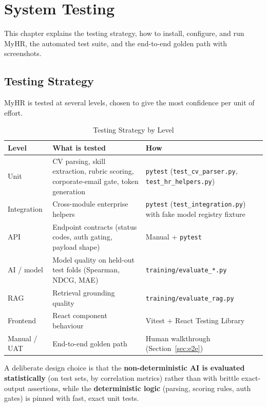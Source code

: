 \documentclass[12pt,a4paper,oneside]{report}
\begin{document}
\chapter{System Testing}
\label{ch:testing}

This chapter explains the testing strategy, how to install, configure, and run MyHR, the
automated test suite, and the end-to-end golden path with screenshots.

\section{Testing Strategy}

MyHR is tested at several levels, chosen to give the most confidence per unit of effort.

\begin{table}[H]
\centering
\caption{Testing Strategy by Level}
\label{tab:teststrategy}
\begin{tabularx}{\textwidth}{L{2.8cm}L{4.5cm}X}
\toprule
\textbf{Level} & \textbf{What is tested} & \textbf{How} \\
\midrule
Unit        & CV parsing, skill extraction, rubric scoring, corporate-email gate, token generation & \texttt{pytest} (\texttt{test\_cv\_parser.py}, \texttt{test\_hr\_helpers.py}) \\
Integration & Cross-module enterprise helpers & \texttt{pytest} (\texttt{test\_integration.py}) with fake model registry fixture \\
API         & Endpoint contracts (status codes, auth gating, payload shape) & Manual + \texttt{pytest} \\
AI / model  & Model quality on held-out test folds (Spearman, NDCG, MAE) & \texttt{training/evaluate\_*.py} \\
RAG         & Retrieval grounding quality & \texttt{training/evaluate\_rag.py} \\
Frontend    & React component behaviour & Vitest + React Testing Library \\
Manual / UAT & End-to-end golden path & Human walkthrough (Section~\ref{sec:e2e}) \\
\bottomrule
\end{tabularx}
\end{table}

A deliberate design choice is that the \textbf{non-deterministic AI is evaluated
statistically} (on test sets, by correlation metrics) rather than with brittle exact-output
assertions, while the \textbf{deterministic logic} (parsing, scoring rules, auth gates) is
pinned with fast, exact unit tests.
\end{document}
